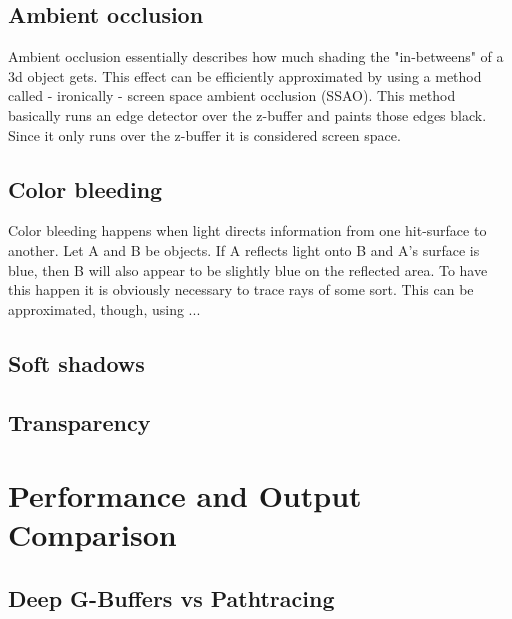 \documentclass{ACGSeminar}
\begin{document}
	\subsection{Ambient occlusion}
		Ambient occlusion essentially describes how much shading the "in-betweens" of a 3d object gets. This effect can be efficiently approximated by using a method called - ironically - screen space ambient occlusion (SSAO). This method basically runs an edge detector over the z-buffer and paints those edges black. Since it only runs over the z-buffer it is considered screen space.
	\subsection{Color bleeding}
		Color bleeding happens when light directs information from one hit-surface to another. Let A and B be objects. If A reflects light onto B and A's surface is blue, then B will also appear
		to be slightly blue on the reflected area. To have this happen it is obviously necessary to trace rays of some sort. This can be approximated, though, using ... %
	\subsection{Soft shadows}

	\subsection{Transparency}

\section{Performance and Output Comparison}
	\subsection{Deep G-Buffers vs Pathtracing}

\printbibliography
\end{document}
